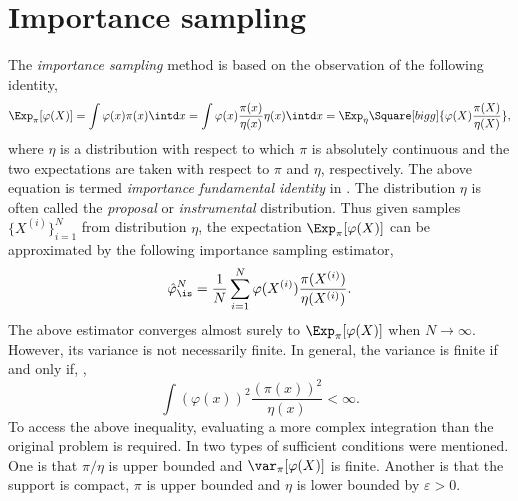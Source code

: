 \section{Importance sampling}
\label{sec:Importance sampling}

The \emph{importance sampling} method is based on the observation of the
following identity,
\begin{equation}
  \Exp_{\pi}[\varphi(X)]
  = \int\varphi(x)\pi(x)\intd x
  = \int\varphi(x)\frac{\pi(x)}{\eta(x)}\eta(x)\intd x
  = \Exp_{\eta}\Square[bigg]{\varphi(X)\frac{\pi(X)}{\eta(X)}},
  \label{eq:impotance fundamental}
\end{equation}
where $\eta$ is a distribution with respect to which $\pi$ is absolutely
continuous and the two expectations are taken with respect to $\pi$ and
$\eta$, respectively. The above equation is termed \emph{importance
fundamental identity} in \cite{Robert:2004tn}. The distribution $\eta$ is
often called the \emph{proposal} or \emph{instrumental} distribution. Thus
given \iid samples $\{X^{(i)}\}_{i=1}^N$ from distribution $\eta$, the
expectation $\Exp_{\pi}[\varphi(X)]$ can be approximated by the following
importance sampling estimator,
\begin{equation}
  \hat\varphi_{\is}^N
  = \frac{1}{N}\sum_{i=1}^N\varphi(X^{(i)})\frac{\pi(X^{(i)})}{\eta(X^{(i)})}.
  \label{eq:is normalized}
\end{equation}
The above estimator converges almost surely to $\Exp_{\pi}[\varphi(X)]$ when
$N\to\infty$. However, its variance is not necessarily finite. In general, the
variance is finite if and only if, \cite[][sec.~3.3.2]{Robert:2004tn},
\begin{equation}
  \int(\varphi(x))^2\frac{(\pi(x))^2}{\eta(x)} < \infty.
\end{equation}
To access the above inequality, evaluating a more complex integration than the
original problem is required. In \cite{Geweke:1989tm} two types of sufficient
conditions were mentioned. One is that $\pi/\eta$ is upper bounded and
$\var_{\pi}[\varphi(X)]$ is finite. Another is that the support is compact,
$\pi$ is upper bounded and $\eta$ is lower bounded by $\varepsilon > 0$.

